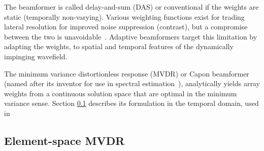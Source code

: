 {The beamformer is called delay-and-sum (DAS) or conventional if the weights are static (temporally non-varying). Various weighting functions exist for trading lateral resolution for improved noise suppression (contrast), but a compromise between the two is unavoidable~\cite{Harris1978}. Adaptive beamformers target this limitation by adapting the weights, to spatial and temporal features of the dynamically impinging wavefield.

The minimum variance distortionless response (MVDR) or Capon beamformer (named after its inventor for use in spectral estimation~\cite{Capon1969}), analytically yields array weights from a continuous solution space that are optimal in the minimum variance sense. Section \ref{sec_es_mvdr} describes its formulation in the temporal domain, used in 









\subsection{Element-space MVDR}\label{sec_es_mvdr}

%

}
